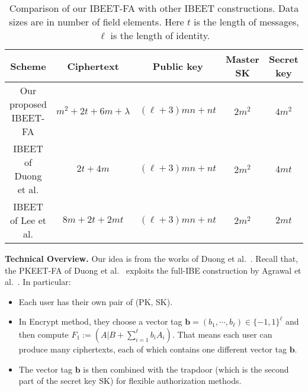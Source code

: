 \documentclass[runningheads,10pt]{llncs}
\def\bf{\mathbf}
\def\b{\bf{b}}
\begin{document}
\begin{table}[pt]	
	\caption{Comparison of our \textsf{IBEET-FA} with other IBEET constructions. Data sizes are in number of field elements. Here $t$ is the length of messages, $\ell$ is the length of identity.}
	
	\centering
	\medskip
	\smallskip
	\small\addtolength{\tabcolsep}{-1pt}
	\begin{tabular}{ c | c | c | c | c }
		\hline
		\textbf{Scheme}&\textbf{Ciphertext}&\textbf{Public key}&\textbf{Master SK}&\textbf{Secret key}\\
		\hline\hline
		Our proposed IBEET-FA& $m^2 + 2t + 6m + \lambda$ &$(\ell+3)mn + nt$ &$2m^2$ &$4m^2$\\
		IBEET of Duong et al. \cite{IBEET-Duong19}& $2t + 4m$ &$(\ell+3)mn + nt$ &$2m^2$ &$4mt$\\
		IBEET of Lee et al. \cite{Lee2016}& $8m + 2t +2mt$ &$(\ell+3)mn + nt$ &$2m^2$ &$2mt$\\
		\hline
	\end{tabular} 
	
	\label{tab3}
\end{table}

\noindent\textbf{Technical Overview.} 
Our idea is from the works of Duong et al.~\cite{IBEET-Duong19,PKEET-FA-Duong20}. Recall that, the PKEET-FA of Duong et al.~\cite{PKEET-FA-Duong20} exploits the full-IBE construction by Agrawal et al.~\cite{ABB10-EuroCrypt}. In particular:
\begin{itemize}
	\item Each user has their own pair of (PK, SK).
	\item In \textsf{Encrypt} method, they choose a vector tag $\b=(b_1,\cdots,b_\ell)\in\{-1,1\}^\ell$ and then compute $F_1:=(A|B + \sum_{i=1}^\ell b_iA_i)$. That means each user can produce many ciphertexts, each of which contains one different vector tag $\b$.
	\item The vector tag $\b$ is then combined with the trapdoor (which is the second part of the secret key SK) for flexible authorization methods.
\end{itemize}
\end{document}
